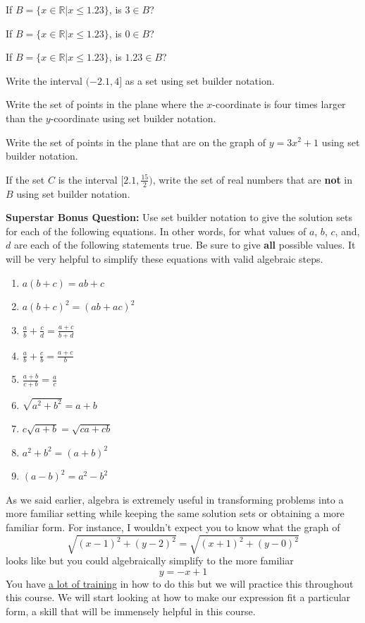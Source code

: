 \bq\label{s1}
\be
\item If $B=\{ x \in \mathbb{R} | x \leq 1.23\}$, is $3 \in B$?
\item If $B=\{ x \in \mathbb{R} | x \leq 1.23\}$, is $0 \in B$?
\item If $B=\{ x \in \mathbb{R} | x \leq 1.23\}$, is $1.23 \in B$?
\item Write the interval $(-2.1,4]$ as a set using set builder notation.
\item Write the set of points in the plane where the $x$-coordinate is four times larger than the $y$-coordinate using set builder notation.
\item Write the set of points in the plane that are on the graph of $y=3x^2+1$ using set builder notation.
\item If the set $C$ is the interval $[2.1,\frac{15}{2})$, write the set of real numbers that are \textbf{not} in $B$ using set builder notation.
\ee
\eq

\textbf{Superstar Bonus Question:} Use set builder notation to give the solution sets for each of the following equations. In other words, for what values of $a$, $b$, $c$, and, $d$ are each of the following statements true. Be sure to give \textbf{all} possible values. It will be very helpful to simplify these equations with valid algebraic steps.
\begin{enumerate}
\item $a(b+c)=ab+c$
\item $a(b+c)^2 =(ab+ac)^2$
\item $\frac{a}{b}+\frac{c}{d} =\frac{a+c}{b+d}$
\item $\frac{a}{b}+\frac{c}{b} =\frac{a+c}{b}$
\item $\frac{a+b}{c+b}=\frac{a}{c}$
\item $\sqrt{a^2+b^2}=a+b$
\item $c \sqrt{a+b}=\sqrt{ca+cb}$
\item $a^2+b^2=(a+b)^2$
\item $(a-b)^2=a^2-b^2$
\end{enumerate}


\begin{info}
As we said earlier, algebra is extremely useful in transforming problems into a more familiar setting while keeping the same solution sets or obtaining a more familiar form. For instance, I wouldn't expect you to know what the graph of $$\sqrt{(x-1)^2+(y-2)^2}=\sqrt{(x+1)^2+(y-0)^2}$$ looks like but you could algebraically simplify to the more familiar $$y=-x+1$$
You have \underline{a lot of training} in how to do this but we will practice this throughout this course. We will start looking at how to make our expression fit a particular form, a skill that will be immensely helpful in this course.
\end{info}

